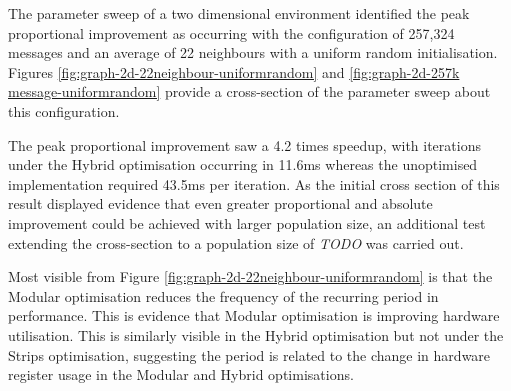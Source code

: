       The parameter sweep of a two dimensional environment identified the peak proportional improvement as occurring with the configuration of 257,324 messages and an average of 22 neighbours with a uniform random initialisation. Figures \ref{fig:graph-2d-22neighbour-uniformrandom} and \ref{fig:graph-2d-257k message-uniformrandom} provide a cross-section of the parameter sweep about this configuration.
      
      The peak proportional improvement saw a 4.2 times speedup, with iterations under the Hybrid optimisation occurring in 11.6ms whereas the unoptimised implementation required 43.5ms per iteration. As the initial cross section of this result displayed evidence that even greater proportional and absolute improvement could be achieved with larger population size, an additional test extending the cross-section to a population size of \textit{TODO} was carried out.
      
      
      Most visible from Figure \ref{fig:graph-2d-22neighbour-uniformrandom} is that the Modular optimisation reduces the frequency of the recurring period in performance. This is evidence that Modular optimisation is improving hardware utilisation. This is similarly visible in the Hybrid optimisation but not under the Strips optimisation, suggesting the period is related to the change in hardware register usage in the Modular and Hybrid optimisations.
      

